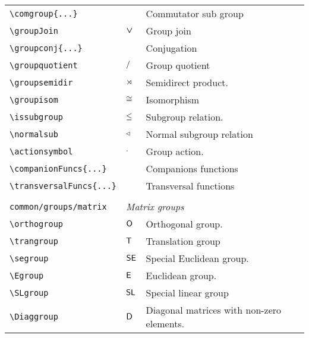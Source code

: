 \begin{longtable}{lll}
 {\color[rgb]{0.5,0.5,0.5}\texttt{\textbackslash comgroup\{...\}}} &  &  Commutator sub group\\ 
 {\color[rgb]{0.5,0.5,0.5}\texttt{\textbackslash groupJoin}} & $\boldsymbol{\vee}$ &  Group join\\ 
 {\color[rgb]{0.5,0.5,0.5}\texttt{\textbackslash groupconj\{...\}}} &  &  Conjugation\\ 
 {\color[rgb]{0.5,0.5,0.5}\texttt{\textbackslash groupquotient}} & $\mathrel{/}$ &  Group quotient\\ 
 {\color[rgb]{0.5,0.5,0.5}\texttt{\textbackslash groupsemidir}} & $\mathrel{\rtimes}$ &  Semidirect product.\\ 
 {\color[rgb]{0.5,0.5,0.5}\texttt{\textbackslash groupisom}} & $\mathrel{\cong}$ &  Isomorphism\\ 
 {\color[rgb]{0.5,0.5,0.5}\texttt{\textbackslash issubgroup}} & $\mathrel{\leq}$ &  Subgroup relation.\\ 
 {\color[rgb]{0.5,0.5,0.5}\texttt{\textbackslash normalsub}} & $\mathrel{\triangleleft}$ &  Normal subgroup relation\\ 
 {\color[rgb]{0.5,0.5,0.5}\texttt{\textbackslash actionsymbol}} & $\mathrel{\cdot}$ &  Group action.\\ 
 {\color[rgb]{0.5,0.5,0.5}\texttt{\textbackslash companionFuncs\{...\}}} &  &  Companions functions\\ 
 {\color[rgb]{0.5,0.5,0.5}\texttt{\textbackslash transversalFuncs\{...\}}} &  &  Transversal functions\\ 
  &  & \\ 
 {\color[rgb]{0.5,0.5,0.5}\texttt{common/groups/matrix}} & \multicolumn{2}{l}{\emph{Matrix groups}}\\ 
 \hline
{\color[rgb]{0.5,0.5,0.5}\texttt{\textbackslash orthogroup}} & $\mathsf{O}$ &  Orthogonal group.\\ 
 {\color[rgb]{0.5,0.5,0.5}\texttt{\textbackslash trangroup}} & $\mathsf{T}$ &   Translation group\\ 
 {\color[rgb]{0.5,0.5,0.5}\texttt{\textbackslash segroup}} & $\mathsf{SE}$ &  Special Euclidean group.\\ 
 {\color[rgb]{0.5,0.5,0.5}\texttt{\textbackslash Egroup}} & $\mathsf{E}$ &   Euclidean group.\\ 
 {\color[rgb]{0.5,0.5,0.5}\texttt{\textbackslash SLgroup}} & $\mathsf{SL}$ &   Special linear group\\ 
 {\color[rgb]{0.5,0.5,0.5}\texttt{\textbackslash Diaggroup}} & $\mathsf{D}$ &   Diagonal matrices with non-zero elements.\\ 

\end{longtable}
